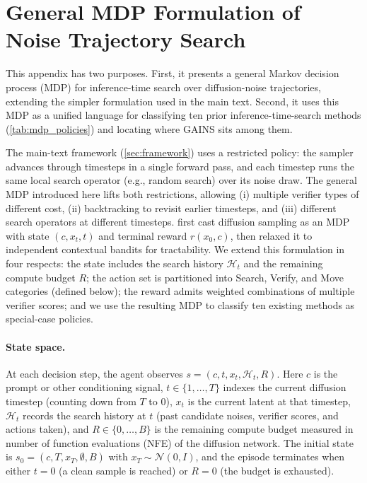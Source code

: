 \section{General MDP Formulation of Noise Trajectory Search}
\label{sec:mdp}

This appendix has two purposes. First, it presents a general Markov decision process (MDP) for inference-time search over diffusion-noise trajectories, extending the simpler formulation used in the main text. Second, it uses this MDP as a unified language for classifying ten prior inference-time-search methods (\cref{tab:mdp_policies}) and locating where \textsc{GAINS} sits among them.

The main-text framework (\cref{sec:framework}) uses a restricted policy: the sampler advances through timesteps in a single forward pass, and each timestep runs the same local search operator (e.g., random search) over its noise draw. The general MDP introduced here lifts both restrictions, allowing (i) multiple verifier types of different cost, (ii) backtracking to revisit earlier timesteps, and (iii) different search operators at different timesteps. \citet{ramesh2025nts} first cast diffusion sampling as an MDP with state $(c, x_t, t)$ and terminal reward $r(x_0, c)$, then relaxed it to independent contextual bandits for tractability. We extend this formulation in four respects: the state includes the search history $\mathcal{H}_t$ and the remaining compute budget $R$; the action set is partitioned into Search, Verify, and Move categories (defined below); the reward admits weighted combinations of multiple verifier scores; and we use the resulting MDP to classify ten existing methods as special-case policies.

\paragraph{State space.}
At each decision step, the agent observes $s = (c, t, x_t, \mathcal{H}_t, R)$. Here $c$ is the prompt or other conditioning signal, $t\in\{1,\dots,T\}$ indexes the current diffusion timestep (counting down from $T$ to $0$), $x_t$ is the current latent at that timestep, $\mathcal{H}_t$ records the search history at $t$ (past candidate noises, verifier scores, and actions taken), and $R\in\{0,\dots,B\}$ is the remaining compute budget measured in number of function evaluations (NFE) of the diffusion network. The initial state is $s_0=(c, T, x_T, \emptyset, B)$ with $x_T\sim\mathcal{N}(0,I)$, and the episode terminates when either $t=0$ (a clean sample is reached) or $R=0$ (the budget is exhausted).

